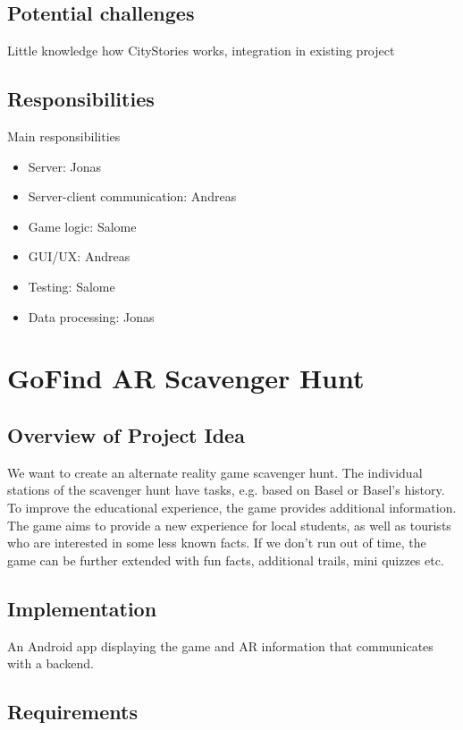 \documentclass[10pt]{article}%
\begin{document}
\subsection{Potential challenges}

Little knowledge how CityStories works, integration in existing project

\subsection{Responsibilities}

Main responsibilities
\begin{itemize}
\item Server: Jonas
\item Server-client communication: Andreas
\item Game logic: Salome
\item GUI/UX: Andreas
\item Testing: Salome
\item Data processing: Jonas
\end{itemize}



\newpage
\section{GoFind AR Scavenger Hunt}

\subsection{Overview of Project Idea}

We want to create an alternate reality game scavenger hunt. The individual stations of the scavenger hunt have tasks, e.g. based on Basel or Basel's history. To improve the educational experience, the game provides additional information.
The game aims to provide a new experience for local students, as well as tourists who are interested in some less known facts.
If we don't run out of time, the game can be further extended with fun facts, additional trails, mini quizzes etc.

\subsection{Implementation}

An Android app displaying the game and AR information that communicates with a backend.

\subsection{Requirements}
\end{document}
